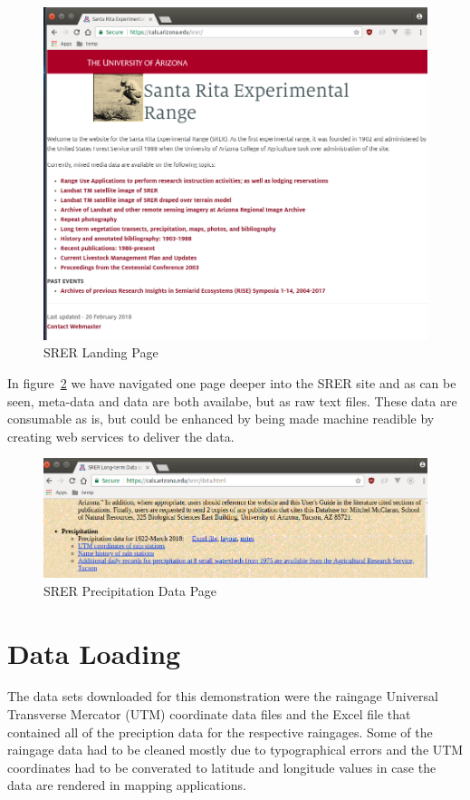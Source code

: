 \begin{figure}[htb]
  \centering\includegraphics[width=\columnwidth]{./images/srer_landing_page.png}
  \caption{SRER Landing Page\cite{hid505SrerWebSite2018}}\label{f:srer_landing_page}
\end{figure}


In figure~\ref{f:srer_precip_data_page} we have navigated one page deeper into 
the SRER site and as can be seen, meta-data and data are both availabe, but as 
raw text files.  These data are consumable as is, but could be enhanced by 
being made machine readible by creating web services to deliver the data.

\begin{figure}[htb]
  \centering\includegraphics[width=\columnwidth]{./images/srer_precip_data_page.png}
  \caption{SRER Precipitation Data Page\cite{hid505SrerWebSite2018}}\label{f:srer_precip_data_page}
\end{figure}

\section{Data Loading}
The data sets downloaded for this demonstration were the raingage Universal 
Transverse Mercator (UTM) coordinate data files and the Excel file that 
contained all of the preciption data for the respective raingages.  Some of 
the raingage data had to be cleaned mostly due to typographical errors and the 
UTM coordinates had to be converated to latitude and longitude values in case 
the data are rendered in mapping applications.

